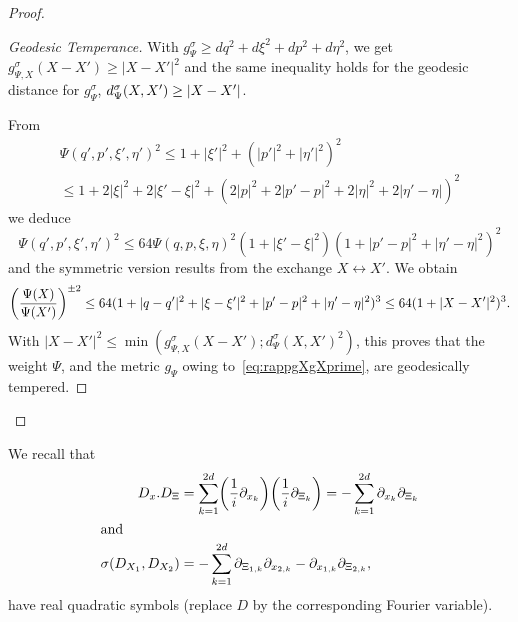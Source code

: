 \documentclass[AHL,Unicode,longabstracts]{cedram}
\let\originalleft\left
\let\originalright\right
\renewcommand{\left}{\mathopen{}\mathclose\bgroup\originalleft}
\renewcommand{\right}{\aftergroup\egroup\originalright}
\begin{document}
\begin{proof}
\begin{proof}[{Geodesic Temperance}]
With $g^{\sigma}_{\Psi}\geq dq^{2}+d\xi^{2}+dp^{2}+d\eta^{2}$, we get $g^{\sigma}_{\Psi,X}(X-X')\geq |X-X'|^{2}$ and the same inequality holds for the geodesic distance for $g_{\Psi}^{\sigma}$, $d^{\sigma}_{\Psi}(X,X')\geq \left|X-X'\right|$.

From
\begin{multline*}
\Psi(q',p',\xi',\eta')^{2}\leq 1+|\xi'|^{2}+(|p'|^{2}+|\eta'|^{2})^{2}\\
\leq 1+2|\xi|^{2}+2|\xi'-\xi|^{2}+(2|p|^{2}+2|p'-p|^{2}+2|\eta|^{2}+2|\eta'-\eta|)^{2}
\end{multline*}
we deduce
\[
\Psi(q',p',\xi',\eta')^{2}\leq 64 \Psi(q,p,\xi,\eta)^{2}(1+|\xi'-\xi|^{2})(1+|p'-p|^{2}+|\eta'-\eta|^{2})^{2}
\]
and the symmetric version results from the exchange $X\leftrightarrow X'$. We obtain
\[
\left(\frac{\Psi(X)}{\Psi(X')}\right)^{\pm 2}\leq 64 (1+|q-q'|^{2}+|\xi-\xi'|^{2}+|p'-p|^{2}+|\eta'-\eta|^{2})^{3}\leq 64(1+|X-X'|^{2})^{3}.
\]
With $|X-X'|^{2}\leq \min (g_{\Psi,X}^{\sigma}(X-X'); d_{\Psi}^{\sigma}(X,X')^{2})$, this proves that the weight $\Psi$, and the metric $g_{\Psi}$ owing to~\eqref{eq:rappgXgXprime}, are geodesically tempered.
\end{proof}
\let\qed\relax
\end{proof}

We recall that
\begin{align*}
D_{x}.D_{\Xi}&=\sum_{k=1}^{2d}\left(\frac{1}{i}\partial_{x_{k}}\right)\left(\frac{1}{i}\partial_{\Xi_{k}}\right)=-\sum_{k=1}^{2d}\partial_{x_{k}}\partial_{\Xi_{k}}\\
\intertext{and}
\sigma(D_{X_{1}},D_{X_{2}}) &=-\sum_{k=1}^{2d}\partial_{\Xi_{1,k}}\partial_{x_{2,k}}-\partial_{x_{1,k}}\partial_{\Xi_{2,k}},
\end{align*}
have real quadratic symbols (replace $D$ by the corresponding Fourier variable).
\end{document}
